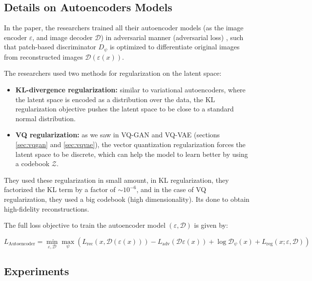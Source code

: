 \subsection{Details on Autoencoders Models}

In the paper, the researchers trained all their autoencoder models (as the image encoder $\varepsilon$, and image decoder $\mathcal{D}$) in adversarial manner (adversarial loss) \cite{vqgan}, such that patch-based discriminator $D_\psi$ is optimized to differentiate original images from reconstructed images $\mathcal{D} (\varepsilon (x))$.

The researchers used two methods for regularization on the latent space:

\begin{itemize}
    \item \textbf{KL-divergence regularization:} similar to variational autoencoders, where the latent space is encoded as a distribution over the data, the KL regularization objective pushes the latent space to be close to a standard normal distribution.
    \item \textbf{VQ regularization:} as we saw in VQ-GAN and VQ-VAE (sections \ref{sec:vqgan} and \ref{sec:vqvae}), the vector quantization regularization forces the latent space to be discrete, which can help the model to learn better by using a codebook $\mathcal{Z}$.
\end{itemize}

They used these regularization in small amount, in KL regularization, they factorized the KL term by a factor of $\sim 10^{-6}$, and in the case of VQ regularization, they used a big codebook (high dimensionality). Its done to obtain high-fidelity reconstructions.

The full loss objective to train the autoencoder model $(\varepsilon, \mathcal{D})$ is given by:

\begin{equation*}
    L_{\text{Autoencoder}} = \min_{\varepsilon, \mathcal{D}} \max_{\psi} \left( L_{\text{rec}} (x, \mathcal{D} (\varepsilon (x))) - L_{\text{adv}} (\mathcal{D} \varepsilon (x)) + \log \mathcal{D}_\psi (x) + L_{\text{reg}} (x; \varepsilon, \mathcal{D}) \right)
\end{equation*}





\subsection{Experiments}

